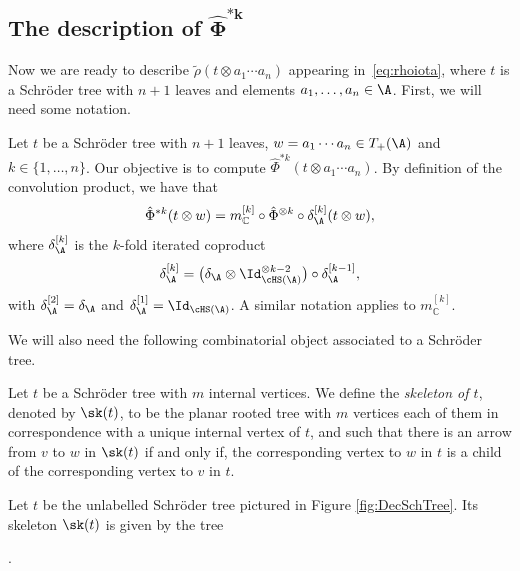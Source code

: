 \subsection[The description of $\hat\Phi^{*k}$]{The description of $\boldsymbol{\hat\Phi^{*k}}$}\label{ssec:convolpower}

Now we are ready to describe $\tilde\rho(t\otimes a_1\cdots a_n)$ appearing in~\eqref{eq:rhoiota}, where $t$ is a Schr\"oder tree with $n+1$ leaves and elements $a_1,\dots, a_n\in \A$. First, we will need some notation.

Let $t$ be a Schr\"oder tree with $n+1$ leaves, $w=a_1\cdots a_n\in T_+(\A)$ and $k \in \{1,\dots, n\}$. Our objective is to compute $\hat\Phi^{*k}(t\otimes a_1\cdots a_n)$. By definition of the convolution product, we have that
\begin{equation}
\label{eq:iterated}
	\hat\Phi^{*k}(t\otimes w) = m_{\mathbb{C}}^{[k]} \circ \hat\Phi^{\otimes k}\circ \delta_\A^{[k]}(t\otimes w),
\end{equation}
where $\delta_\A^{[k]}$ is the $k$-fold iterated coproduct
\[
	\delta_\A^{[k]} = \big(\delta_\A \otimes \Id_{\cHS(\A)}^{\otimes k-2}\big)\circ \delta_{\A}^{[k-1]},
\]
with $\delta_\A^{[2]} = \delta_\A$ and $\delta_\A^{[1]} = \Id_{\cHS(\A)}$. A similar notation applies to $m_{\mathbb{C}}^{[k]}$.

 We will also need the following combinatorial object associated to a Schr\"oder tree.

\begin{Definition}
Let $t$ be a Schr\"oder tree with $m$ internal vertices. We define the \textit{skeleton of $t$}, denoted by $\sk(t)$, to be the planar rooted tree with $m$ vertices each of them in correspondence with a unique internal vertex of $t$, and such that there is an arrow from $v$ to $w$ in $\sk(t)$ if and only if, the corresponding vertex to $w$ in $t$ is a child of the corresponding vertex to $v$ in $t$.
\end{Definition}

\begin{Example}
Let $t$ be the unlabelled Schr\"oder tree pictured in Figure \ref{fig:DecSchTree}. Its skeleton $\sk(t)$ is given by the tree
.
\end{Example}

